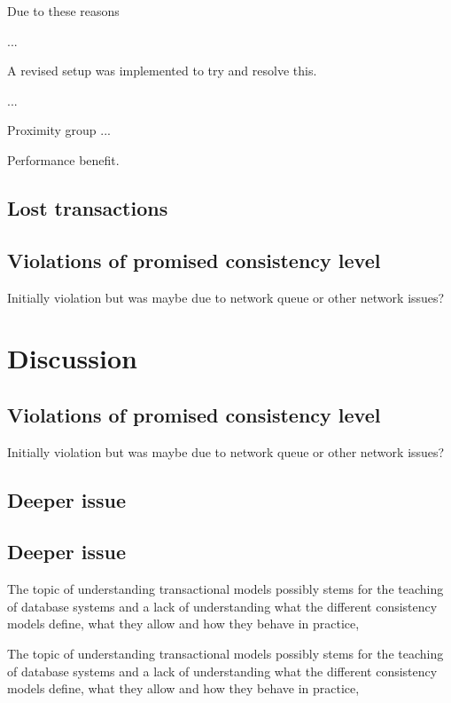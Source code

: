 \documentclass[a4paper,10pt,titlepage]{report}
\begin{document}
    Due to these reasons

    ...

    A revised setup was implemented to try and resolve this.

    ...

    Proximity group
    ...


    Performance benefit.

    \subsection{Lost transactions}

    \subsection{Violations of promised consistency level}
    Initially violation but was maybe due to network queue or other network issues?


    \section{Discussion}

    \subsection{Violations of promised consistency level}

    Initially violation but was maybe due to network queue or other network issues?


    \subsection{Deeper issue}

    \subsection{Deeper issue}
    The topic of understanding transactional models possibly stems for the teaching of database systems and a lack of understanding what the different consistency models define, what they allow and how they behave in practice,

    The topic of understanding transactional models possibly stems for the teaching of database systems and a lack of understanding what the different consistency models define, what they allow and how they behave in practice,
\end{document}
